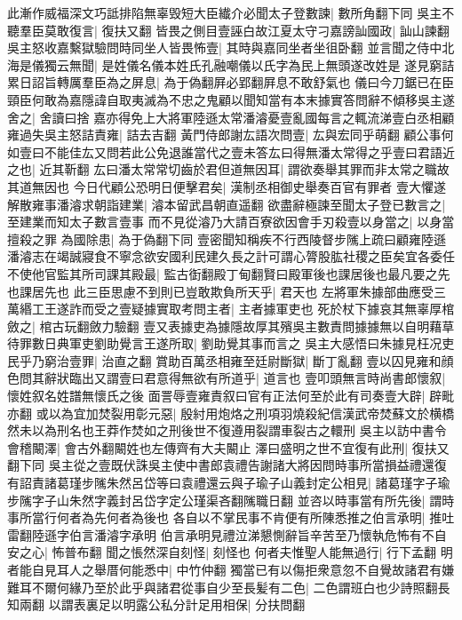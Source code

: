 此漸作威福深文巧詆排陷無辜毁短大臣纎介必聞太子登數諫|{
	數所角翻下同}
吳主不聽羣臣莫敢復言|{
	復扶又翻}
皆畏之側目壹誣白故江夏太守刁嘉謗訕國政|{
	訕山諫翻}
吳主怒收嘉繫獄驗問時同坐人皆畏怖壹|{
	其時與嘉同坐者坐徂卧翻}
並言聞之侍中北海是儀獨云無聞|{
	是姓儀名儀本姓氏孔融嘲儀以氏字為民上無頭遂改姓是}
遂見窮詰累日詔旨轉厲羣臣為之屏息|{
	為于偽翻屛必郢翻屛息不敢舒氣也}
儀曰今刀鋸已在臣頸臣何敢為嘉隱諱自取夷滅為不忠之鬼顧以聞知當有本末據實答問辭不傾移吳主遂舍之|{
	舍讀曰捨}
嘉亦得免上大將軍陸遜太常潘濬憂壹亂國每言之輒流涕壹白丞相顧雍過失吳主怒詰責雍|{
	詰去吉翻}
黃門侍郎謝厷語次問壹|{
	厷與宏同乎萌翻}
顧公事何如壹曰不能佳厷又問若此公免退誰當代之壹未答厷曰得無潘太常得之乎壹曰君語近之也|{
	近其靳翻}
厷曰潘太常常切齒於君但道無因耳|{
	謂欲奏舉其罪而非太常之職故其道無因也}
今日代顧公恐明日便擊君矣|{
	漢制丞相御史舉奏百官有罪者}
壹大懼遂解散雍事潘濬求朝詣建業|{
	濬本留武昌朝直遥翻}
欲盡辭極諫至聞太子登已數言之|{
	至建業而知太子數言壹事}
而不見從濬乃大請百寮欲因會手刃殺壹以身當之|{
	以身當擅殺之罪}
為國除患|{
	為于偽翻下同}
壹密聞知稱疾不行西陵督步隲上疏曰顧雍陸遜潘濬志在竭誠寢食不寧念欲安國利民建久長之計可謂心膂股肱社稷之臣矣宜各委任不使他官監其所司課其殿最|{
	監古衘翻殿丁甸翻賢曰殿軍後也課居後也最凡要之先也課居先也}
此三臣思慮不到則已豈敢欺負所天乎|{
	君天也}
左將軍朱據部曲應受三萬緡工王遂詐而受之壹疑據實取考問主者|{
	主者據軍吏也}
死於杖下據哀其無辜厚棺斂之|{
	棺古玩翻斂力驗翻}
壹又表據吏為據隱故厚其殯吳主數責問據據無以自明藉草待罪數日典軍吏劉助覺言王遂所取|{
	劉助覺其事而言之}
吳主大感悟曰朱據見枉况吏民乎乃窮治壹罪|{
	治直之翻}
賞助百萬丞相雍至廷尉斷獄|{
	斷丁亂翻}
壹以囚見雍和顔色問其辭狀臨出又謂壹曰君意得無欲有所道乎|{
	道言也}
壹叩頭無言時尚書郎懷叙|{
	懷姓叙名姓譜無懷氏之後}
面詈辱壹雍責叙曰官有正法何至於此有司奏壹大辟|{
	辟毗亦翻}
或以為宜加焚裂用彰元惡|{
	殷紂用炮烙之刑項羽燒殺紀信漢武帝焚蘇文於横橋然未以為刑名也王莽作焚如之刑後世不復遵用裂謂車裂古之轘刑}
吳主以訪中書令會稽闞澤|{
	會古外翻闞姓也左傳齊有大夫闞止}
澤曰盛明之世不宜復有此刑|{
	復扶又翻下同}
吳主從之壹既伏誅吳主使中書郎袁禮告謝諸大將因問時事所當損益禮還復有詔責諸葛瑾步隲朱然呂岱等曰袁禮還云與子瑜子山義封定公相見|{
	諸葛瑾字子瑜步隲字子山朱然字義封呂岱字定公瑾渠吝翻隲職日翻}
並咨以時事當有所先後|{
	謂時事所當行何者為先何者為後也}
各自以不掌民事不肯便有所陳悉推之伯言承明|{
	推吐雷翻陸遜字伯言潘濬字承明}
伯言承明見禮泣涕懇惻辭旨辛苦至乃懷執危怖有不自安之心|{
	怖普布翻}
聞之悵然深自刻怪|{
	刻怪也}
何者夫惟聖人能無過行|{
	行下孟翻}
明者能自見耳人之舉厝何能悉中|{
	中竹仲翻}
獨當已有以傷拒衆意忽不自覺故諸君有嫌難耳不爾何緣乃至於此乎與諸君從事自少至長髪有二色|{
	二色謂班白也少詩照翻長知兩翻}
以謂表裏足以明露公私分計足用相保|{
	分扶問翻}

